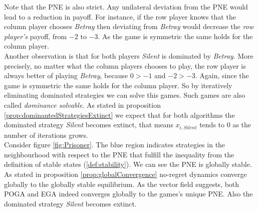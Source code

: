 Note that the PNE is also strict. Any unilateral deviation from the PNE would lead to a reduction in payoff. For instance, if the row player knows that the column player  chooses \textit{Betray} then deviating from \textit{Betray} would decrease the \textit{row player's} payoff, from $-2$ to $-3$. As the game is symmetric the same holds for the column player. \\

Another observation is that for both players \textit{Silent} is dominated by \textit{Betray}. More precisely, no matter what the column players chooses to play, the row player is always better of playing \textit{Betray}, because $0 > -1$ and $-2 > -3$. Again, since the game is symmetric the same holds for the column player. So by iteratively eliminating dominated strategies we can solve this games. Such games are also called \textit{dominance solvable}. As stated in proposition \ref{prop:dominantedStrategiesExtinct} we expect that for both algorithms the dominated strategy \textit{Silent} becomes extinct, that means $x_{i,Silent}$ tends to $0$ as the number of iterations grows.  \\

Consider figure \ref{fig:Prisoner}. The blue region indicates strategies in the neighbourhood with respect to the PNE that fulfill the inequality from the definition of stable states (\ref{def:stability}). We can see the PNE is globally stable. As stated in proposition \ref{prop:globalConvergence} no-regret dynamics converge globally to the globally stable equilibrium. As the vector field suggests, both POGA and EGA indeed converges globally to the games's unique PNE. Also the dominated strategy \textit{Silent} becomes extinct.



